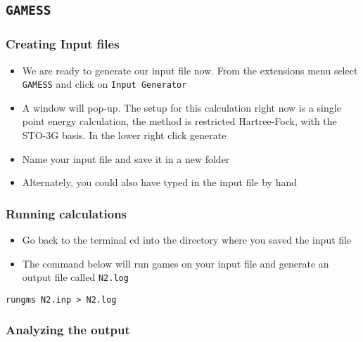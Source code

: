 \documentclass[11pt]{article}
\begin{document}
\subsection{\texttt{GAMESS}}
\label{sec-1-4}

\subsubsection{Creating Input files}
\label{sec-1-4-1}

\begin{itemize}
\item We are ready to generate our input file now. From the extensions menu select \texttt{GAMESS} and click on \texttt{Input Generator}

\item A window will pop-up. The setup for this calculation right now is a single point energy calculation, the method is restricted Hartree-Fock, with the STO-3G basis. In the lower right click generate

\item Name your input file and save it in a new folder

\item Alternately, you could also have typed in the input file by hand
\end{itemize}

\subsubsection{Running calculations}
\label{sec-1-4-2}

\begin{itemize}
\item Go back to the terminal cd into the directory where you saved the input file

\item The command below will run games on your input file and generate an output file called \texttt{N2.log}
\end{itemize}

\begin{verbatim}
rungms N2.inp > N2.log
\end{verbatim}



\subsubsection{Analyzing the output}
\label{sec-1-4-3}
\end{document}
